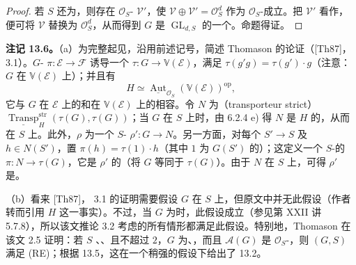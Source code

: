 \begin{proof}
若 $S$ 还为，则存在 $\mathcal O_S$- $\mathcal V'$，使 $\mathcal V\oplus\mathcal V'=\mathcal O_S^d$ 作为 $\mathcal O_S$-成立。把 $\mathcal V'$ 看作，便可将 $\mathcal V$ 替换为 $\mathcal O_S^d$，从而得到 $G$ 是 $\operatorname{GL}_{d,S}$ 的一个。命题得证。
\end{proof}

\textbf{注记 13.6。}（a）为完整起见，沿用前述记号，简述 Thomason 的论证（[Th87]， 3.1）。$G$- $\pi:\mathcal E\to\mathcal F$ 诱导一个 $\tau:G\to\mathbb V(\mathcal E)$，满足 $\tau(g'g)=\tau(g')\cdot g$（注意：$G$ 在 $\mathbb V(\mathcal E)$ 上）；并且有
\[
H\simeq\underline{\operatorname{Aut}}_{\mathcal O_S}(\mathbb V(\mathcal E))^{\mathrm{op}},
\]
它与 $G$ 在 $\mathcal E$ 上的和在 $\mathbb V(\mathcal E)$ 上的相容。令 $N$ 为（transporteur strict）$\underline{\operatorname{Transp}}^{\mathrm{str}}_H(\tau(G),\tau(G))$；当 $G$ 在 $S$ 上时，由 6.2.4 e) 得 $N$ 是 $H$ 的，从而在 $S$ 上。此外，$\rho$ 为一个 $S$- $\rho':G\to N$。另一方面，对每个 $S'\to S$ 及 $h\in N(S')$，置 $\pi(h)=\tau(1)\cdot h$（其中 $1$ 为 $G(S')$ 的）；这定义一个 $S$-的 $\pi:N\to\tau(G)$，它是 $\rho'$ 的（将 $G$ 等同于 $\tau(G)$）。由于 $N$ 在 $S$ 上，可得 $\rho'$ 是。

（b）看来 [Th87]， 3.1 的证明需要假设 $G$ 在 $S$ 上，但原文中并无此假设（作者转而引用 $H$ 这一事实）。不过，当 $G$ 为时，此假设成立（参见第 XXII 讲 5.7.8），所以该文推论 3.2 考虑的所有情形都满足此假设。特别地，Thomason 在该文 2.5 证明：若 $S$ 、、且不超过 $2$，$G$ 为、，而且 $\mathscr A(G)$ 是 $\mathcal O_S$-，则 $(G,S)$ 满足 (RE)；根据 13.5，这在一个稍强的假设下给出了 13.2。

